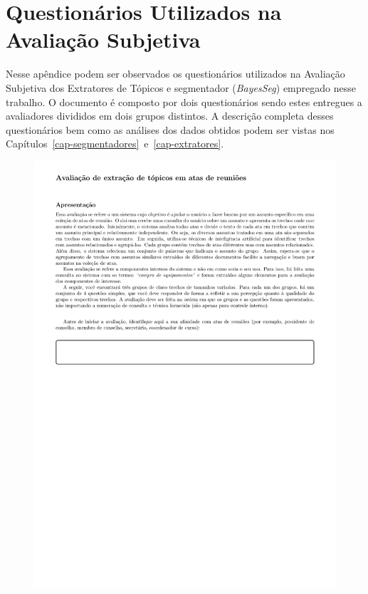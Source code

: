 \chapter{ Questionários Utilizados na Avaliação Subjetiva}\label{apendice2}





Nesse apêndice podem ser observados os questionários utilizados na Avaliação Subjetiva dos Extratores de Tópicos e segmentador (\textit{BayesSeg}) empregado nesse trabalho. 
O documento é composto por dois questionários sendo estes entregues a avaliadores divididos em dois grupos distintos.
A descrição completa desses questionários bem como as análises dos dados obtidos podem ser vistas nos Capítulos~\ref{cap-segmentadores}~e~\ref{cap-extratores}.


\begin{figure}[h!]
\center
	\includegraphics[trim={ 40 0 0 0 }, trim={ 0 60 0 66 }, page=1,width=1.1\textwidth]{anexos/avaliacao-sistema/avaliacao-sistema.pdf}
\end{figure}


